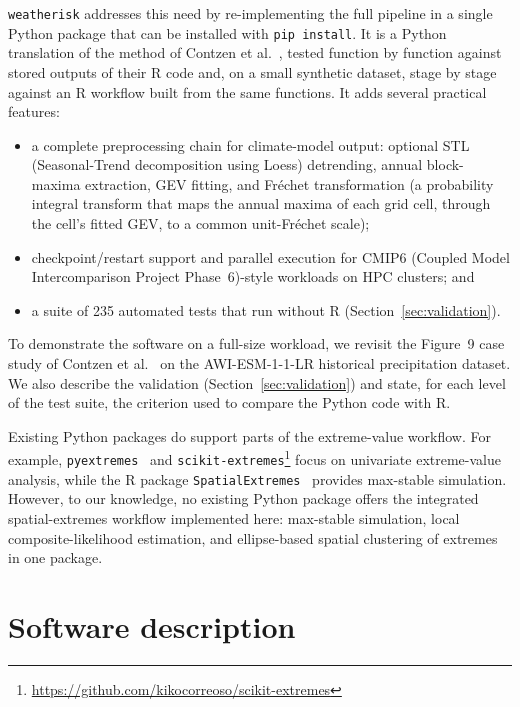\documentclass[preprint,12pt,a4paper]{elsarticle}
\newcommand{\rev}[1]{{#1}}
\newcommand{\revb}[1]{{#1}}
\newcommand{\revo}[1]{{#1}}
\begin{document}
\texttt{weatherisk} addresses this need by re-implementing the full
pipeline in a single Python package that can be installed with
\texttt{pip install}.  It is a Python translation of the
method of Contzen et al.~\cite{contzen2025}, tested function by
function against stored outputs of their R code and, on a small
synthetic dataset, stage by stage against an R workflow built from
the same functions. It adds several practical features:
\begin{itemize}
\item \rev{a complete preprocessing chain for climate-model output:
  optional STL (Seasonal-Trend decomposition using Loess) detrending,
  annual block-maxima extraction, GEV fitting, and Fr\'{e}chet
  transformation (a probability integral transform that maps the
  annual maxima of each grid cell, through the cell's fitted GEV, to
  a common unit-Fr\'{e}chet scale)};
\item \rev{checkpoint/restart support and parallel execution for
  CMIP6\revo{ (Coupled Model Intercomparison
  Project Phase~6)}-style workloads on HPC clusters}; and
\item a suite of 235 automated tests that run without R
  (Section~\ref{sec:validation}).
\end{itemize}

\rev{To demonstrate the software on a full-size workload, we
\revb{revisit the Figure~9 case study} of Contzen et al.~\cite{contzen2025} on the
AWI-ESM-1-1-LR historical precipitation dataset. We also describe
the validation (Section~\ref{sec:validation}) and state, for each
level of the test suite, the criterion used to compare the Python
code with R.}

Existing Python packages do support parts of the extreme-value workflow.
For example, \texttt{pyextremes}~\cite{pyextremes} and
\texttt{scikit-extremes}\footnote{\url{https://github.com/kikocorreoso/scikit-extremes}}
focus on univariate extreme-value analysis, while the R package
\texttt{SpatialExtremes}~\cite{spatialextremes} provides max-stable simulation.
However, to our knowledge, no existing Python package offers the
integrated spatial-extremes workflow implemented here: max-stable
simulation, local composite-likelihood estimation, and ellipse-based
spatial clustering of extremes in one package.

\section{Software description}
\label{sec:description}
\end{document}
